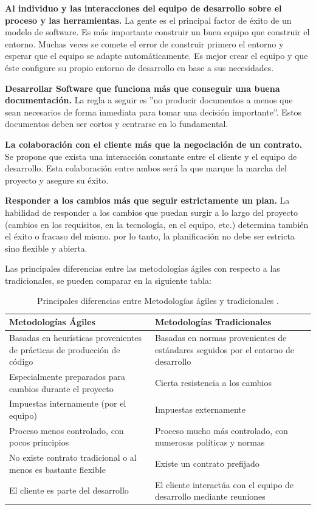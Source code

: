 \begin{description}
\item \textbf{Al individuo y las interacciones del equipo de desarrollo sobre el proceso y las herramientas.} La gente es el principal factor de éxito de un modelo de software. Es más importante construir un buen equipo que construir el entorno. Muchas veces se comete el error de construir primero el entorno y esperar que el equipo se adapte automáticamente. Es mejor crear el equipo y que éste configure su propio entorno de desarrollo en base a sus necesidades.
\item \textbf{Desarrollar Software que funciona más que conseguir una buena documentación.} La regla a seguir es ''no producir documentos a menos que sean necesarios de forma inmediata para tomar una decisión importante''. Estos documentos deben ser cortos y centrarse en lo fundamental.

\item \textbf{La colaboración con el cliente más que la negociación de un contrato.} Se propone que exista una interacción constante entre el cliente y el equipo de desarrollo. Esta colaboración entre ambos será la que marque la marcha del proyecto y asegure su éxito.
\item \textbf{Responder a los cambios más que seguir estrictamente un plan.} La habilidad de responder a los cambios que puedan surgir a lo largo del proyecto (cambios en los requisitos, en la tecnología, en el equipo, etc.) determina también el éxito o fracaso del mismo. por lo tanto, la planificación no debe ser estricta sino flexible y abierta.
\end{description}

Las principales diferencias entre las metodologías ágiles con respecto a las tradicionales, se pueden comparar en la siguiente tabla: 

\begin{table}[H]
 \centering
 \begin{tabular}{|p{6cm}|p{6cm}|}
 \hline
 \textbf{Metodologías Ágiles} & \textbf{Metodologías Tradicionales} \\
 \hline
Basadas en heurísticas provenientes de prácticas de producción de código & Basadas en normas provenientes de estándares seguidos por el entorno de desarrollo\\
 \hline
Especialmente preparados para cambios durante el proyecto & Cierta resistencia a los cambios\\
\hline
Impuestas internamente (por el equipo) & Impuestas externamente\\
\hline
Proceso menos controlado, con pocos principios &Proceso mucho más controlado, con numerosas políticas y normas\\
\hline
No existe contrato tradicional o al menos es bastante flexible & Existe un contrato prefijado\\
\hline
El cliente es parte del desarrollo & El cliente interactúa con el equipo de desarrollo mediante reuniones\\
\hline
 \end{tabular}
 \caption{Principales diferencias entre Metodologías ágiles y tradicionales \citep{canos2012}.}
\end{table}

